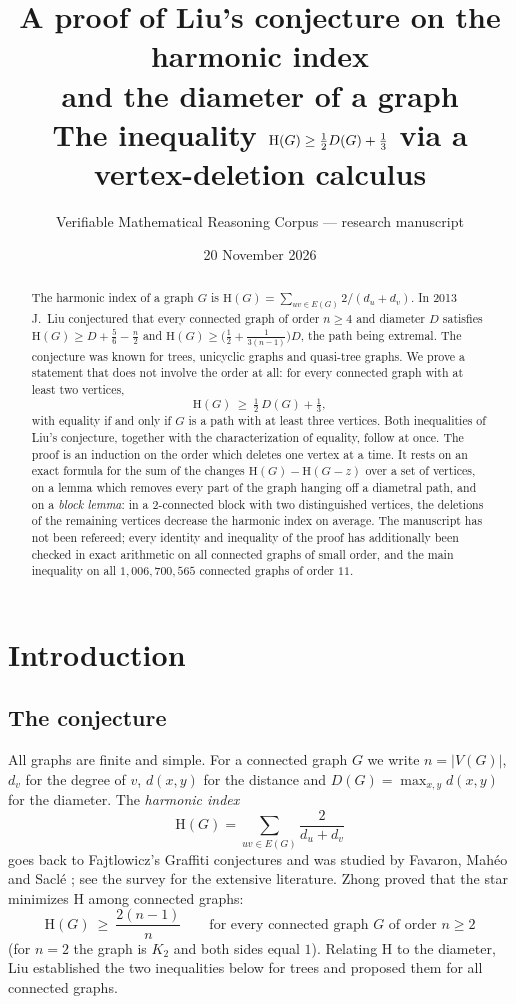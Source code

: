 \documentclass[11pt]{article}
\title{\textbf{A proof of Liu's conjecture on the harmonic index\\ and the diameter of a graph}\\[4pt]
\large The inequality $\Hm(G)\ge \tfrac12\D(G)+\tfrac13$ via a vertex-deletion calculus}
\author{Verifiable Mathematical Reasoning Corpus --- research manuscript}
\date{20 November 2026}
\theoremstyle{definition}
\theoremstyle{remark}
\newcommand{\Hm}{\mathrm{H}}
\newcommand{\D}{D}
\begin{document}
\maketitle

\begin{abstract}
The harmonic index of a graph $G$ is $\Hm(G)=\sum_{uv\in E(G)}2/(d_u+d_v)$. In 2013 J.~Liu
conjectured that every connected graph of order $n\ge4$ and diameter $\D$ satisfies
$\Hm(G)\ge \D+\tfrac56-\tfrac n2$ and $\Hm(G)\ge\bigl(\tfrac12+\tfrac1{3(n-1)}\bigr)\D$, the path
being extremal. The conjecture was known for trees, unicyclic graphs and quasi-tree graphs. We
prove a statement that does not involve the order at all: for every connected graph with at
least two vertices,
\[
 \Hm(G)\ \ge\ \tfrac12\,\D(G)+\tfrac13 ,
\]
with equality if and only if $G$ is a path with at least three vertices. Both inequalities of
Liu's conjecture, together with the characterization of equality, follow at once. The proof
is an induction on the order which deletes one vertex at a time. It rests on an exact formula
for the sum of the changes $\Hm(G)-\Hm(G-z)$ over a set of vertices, on a lemma which removes
every part of the graph hanging off a diametral path, and on a \emph{block lemma}: in a
$2$-connected block with two distinguished vertices, the deletions of the remaining vertices
decrease the harmonic index on average. The manuscript has not been refereed; every identity
and inequality of the proof has additionally been checked in exact arithmetic on all connected
graphs of small order, and the main inequality on all $1{,}006{,}700{,}565$ connected graphs
of order $11$.
\end{abstract}

\section{Introduction}\label{sec:intro}

\subsection{The conjecture}
All graphs are finite and simple. For a connected graph $G$ we write $n=|V(G)|$, $d_v$ for the
degree of $v$, $d(x,y)$ for the distance and $\D(G)=\max_{x,y}d(x,y)$ for the diameter. The
\emph{harmonic index}
\[
 \Hm(G)=\sum_{uv\in E(G)}\frac{2}{d_u+d_v}
\]
goes back to Fajtlowicz's Graffiti conjectures \cite{Faj} and was studied by Favaron, Mah\'eo
and Sacl\'e \cite{FMS}; see the survey \cite{AZG} for the extensive literature. Zhong
\cite{Zhong} proved that the star minimizes $\Hm$ among connected graphs:
\begin{equation}\label{eq:zhong}
 \Hm(G)\ \ge\ \frac{2(n-1)}{n}\qquad\text{for every connected graph $G$ of order $n\ge2$}
\end{equation}
(for $n=2$ the graph is $K_2$ and both sides equal $1$).
Relating $\Hm$ to the diameter, Liu \cite{Liu} established the two inequalities below for
trees and proposed them for all connected graphs.
\end{document}
